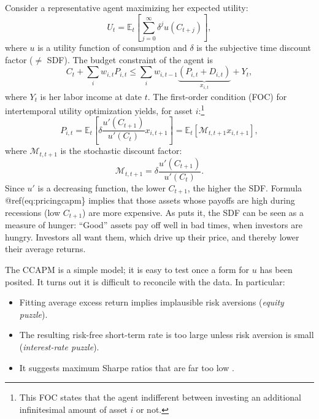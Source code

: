 \documentclass[
  12pt,
]{book}
\providecommand{\tightlist}{%
  \setlength{\itemsep}{0pt}\setlength{\parskip}{0pt}}
\theoremstyle{definition}
\theoremstyle{definition}
\theoremstyle{definition}
\theoremstyle{definition}
\theoremstyle{remark}
\begin{document}
Consider a representative agent maximizing her expected utility:
\[
U_t = \mathbb{E}_t \left[ \sum_{j=0}^\infty \delta^j u(C_{t+j}) \right],
\]
where \(u\) is a utility function of consumption and \(\delta\) is the subjective time discount factor (\(\ne\) SDF). The budget constraint of the agent is
\[
C_t + \sum_i w_{i,t} P_{i,t} \le \sum_i w_{i,t-1}\underbrace{(P_{i,t}+D_{i,t})}_{x_{i,t}} + Y_t,
\]
where \(Y_t\) is her labor income at date \(t\). The first-order condition (FOC) for intertemporal utility optimization yields, for asset \(i\):\footnote{This FOC states that the agent indifferent between investing an additional infinitesimal amount of asset \(i\) or not.}
\begin{equation}
P_{i,t} = \mathbb{E}_t \left[ \delta \frac{u'(C_{t+1})}{u'(C_{t})} x_{i,t+1} \right] = \mathbb{E}_t \left[ \mathcal{M}_{t,t+1} x_{i,t+1} \right],\label{eq:pricingcapm}
\end{equation}
where \(\mathcal{M}_{t,t+1}\) is the stochastic discount factor:
\[
\boxed{\mathcal{M}_{t,t+1}=\delta \dfrac{u'(C_{t+1})}{u'(C_{t})}.}
\]
Since \(u'\) is a decreasing function, the lower \(C_{t+1}\), the higher the SDF. Formula @ref(eq:pricingcapm\} implies that those assets whose payoffs are high during recessions (low \(C_{t+1}\)) are more expensive. As \citet{Cochrane_2005} puts it, the SDF can be seen as a measure of hunger: ``Good'' assets pay off well in bad times, when investors are hungry. Investors all want them, which drive up their price, and thereby lower their average returns.

The CCAPM is a simple model; it is easy to test once a form for \(u\) has been posited. It turns out it is difficult to reconcile with the data. In particular:

\begin{itemize}
\tightlist
\item
  Fitting average excess return implies implausible risk aversions (\emph{equity puzzle}).
\item
  The resulting risk-free short-term rate is too large unless risk aversion is small (\emph{interest-rate puzzle}).
\item
  It suggests maximum Sharpe ratios that are far too low \citep{Hansen_Jagannathan_1991}.
\end{itemize}
\end{document}
